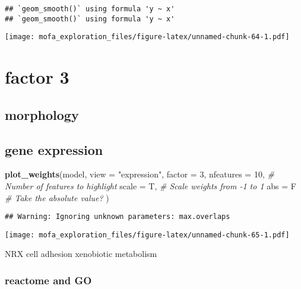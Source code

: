 \documentclass[
]{article}
\newenvironment{Shaded}{\begin{snugshade}}{\end{snugshade}}
\newcommand{\CommentTok}[1]{\textcolor[rgb]{0.56,0.35,0.01}{\textit{#1}}}
\newcommand{\DataTypeTok}[1]{\textcolor[rgb]{0.13,0.29,0.53}{#1}}
\newcommand{\DecValTok}[1]{\textcolor[rgb]{0.00,0.00,0.81}{#1}}
\newcommand{\KeywordTok}[1]{\textcolor[rgb]{0.13,0.29,0.53}{\textbf{#1}}}
\newcommand{\NormalTok}[1]{#1}
\newcommand{\StringTok}[1]{\textcolor[rgb]{0.31,0.60,0.02}{#1}}
\begin{document}
\begin{verbatim}
## `geom_smooth()` using formula 'y ~ x'
## `geom_smooth()` using formula 'y ~ x'
\end{verbatim}

\texttt{[image: mofa\_exploration\_files/figure-latex/unnamed-chunk-64-1.pdf]}

\hypertarget{factor-3}{%
\section{factor 3}\label{factor-3}}

\hypertarget{morphology-1}{%
\subsection{morphology}\label{morphology-1}}

\hypertarget{gene-expression-2}{%
\subsection{gene expression}\label{gene-expression-2}}

\begin{Shaded}
\begin{Highlighting}[]
\KeywordTok{plot_weights}\NormalTok{(model,}
  \DataTypeTok{view =} \StringTok{"expression"}\NormalTok{,}
  \DataTypeTok{factor =} \DecValTok{3}\NormalTok{,}
  \DataTypeTok{nfeatures =} \DecValTok{10}\NormalTok{,     }\CommentTok{# Number of features to highlight}
  \DataTypeTok{scale =}\NormalTok{ T,          }\CommentTok{# Scale weights from -1 to 1}
  \DataTypeTok{abs =}\NormalTok{ F             }\CommentTok{# Take the absolute value?}
\NormalTok{)}
\end{Highlighting}
\end{Shaded}

\begin{verbatim}
## Warning: Ignoring unknown parameters: max.overlaps
\end{verbatim}

\texttt{[image: mofa\_exploration\_files/figure-latex/unnamed-chunk-65-1.pdf]}

NRX cell adhesion xenobiotic metabolism

\hypertarget{reactome-and-go-1}{%
\subsubsection{reactome and GO}\label{reactome-and-go-1}}
\end{document}
